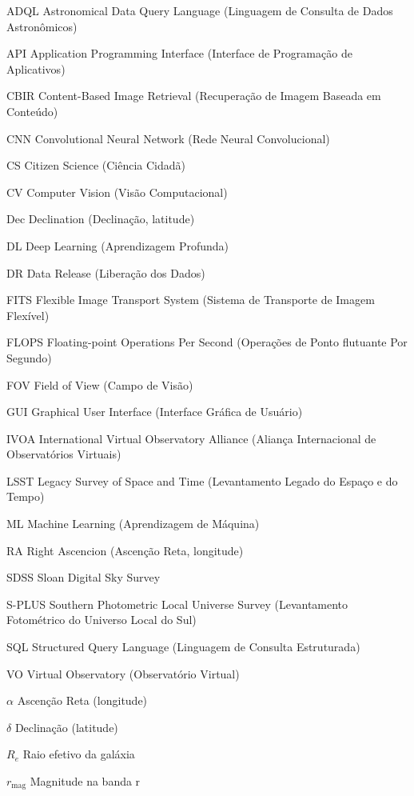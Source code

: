 \documentclass[
	12pt,				%
	openright,			%
	twoside,			%
	a4paper,			%
  sumario=tradicional,
	english,			%
	french,				%
	spanish,			%
	brazil				%
	]{abntex2}
\begin{document}
\begin{siglas}
  \item[ADQL] Astronomical Data Query Language (Linguagem de Consulta de Dados Astronômicos)
  \item[API] Application Programming Interface (Interface de Programação de Aplicativos)
  \item[CBIR] Content-Based Image Retrieval (Recuperação de Imagem Baseada em Conteúdo)
  \item[CNN] Convolutional Neural Network (Rede Neural Convolucional)
  \item[CS] Citizen Science (Ciência Cidadã)
  \item[CV] Computer Vision (Visão Computacional)
  \item[Dec] Declination (Declinação, latitude)
  \item[DL] Deep Learning (Aprendizagem Profunda)
  \item[DR] Data Release (Liberação dos Dados)
  \item[FITS] Flexible Image Transport System (Sistema de Transporte de Imagem Flexível)
  \item[FLOPS] Floating-point Operations Per Second (Operações de Ponto flutuante Por Segundo)
  \item[FOV] Field of View (Campo de Visão)
  \item[GUI] Graphical User Interface (Interface Gráfica de Usuário)
  \item[IVOA] International Virtual Observatory Alliance (Aliança Internacional de Observatórios Virtuais)
  \item[LSST] Legacy Survey of Space and Time (Levantamento Legado do Espaço e do Tempo)
  \item[ML] Machine Learning (Aprendizagem de Máquina)
  \item[RA] Right Ascencion (Ascenção Reta, longitude)
  \item[SDSS] Sloan Digital Sky Survey
  \item[S-PLUS] Southern Photometric Local Universe Survey (Levantamento Fotométrico do Universo Local do Sul)
  \item[SQL] Structured Query Language (Linguagem de Consulta Estruturada)
  \item[VO] Virtual Observatory (Observatório Virtual)
\end{siglas}

\begin{simbolos}
  \item[$ \alpha $] Ascenção Reta (longitude)
  \item[$ \delta $] Declinação (latitude)
  \item[$R_e$] Raio efetivo da galáxia
  \item[$r_{\mathrm{mag}}$] Magnitude na banda r
\end{simbolos}
\end{document}
